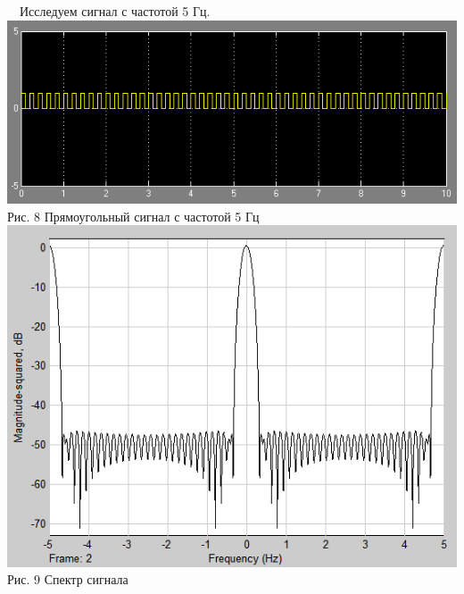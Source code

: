 \documentclass[a4paper]{article}
\begin{document}
~\
\flushleft Исследуем сигнал с частотой 5 Гц.
\center\includegraphics[scale = 0.8]{square_sim1.png} \\ Рис. 8 Прямоугольный сигнал с частотой 5 Гц \\ 
\center\includegraphics[scale = 0.7]{square_sp1.png} \\ Рис. 9 Спектр сигнала \\
\end{document}
